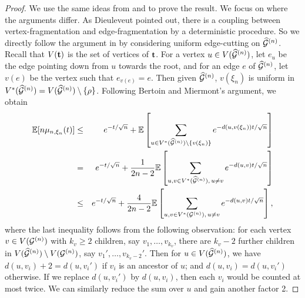 \documentclass[11pt,a4paper]{article}
\newcommand{\bE}{\mathbb{E}}
\newcommand{\cG}{\mathcal{G}}
\begin{document}
\begin{proof}
We use the same ideas from  \cite[Corollary 2]{BM} and   \cite[Lemma 4.5]{Die13} to prove the result. We focus on where the arguments differ. As Dieuleveut pointed out, there is a coupling between vertex-fragmentation and edge-fragmentation by a deterministic procedure. So we directly follow the argument in \cite{BM} by considering uniform edge-cutting on $\widehat{\cal G}^{(n)}$. Recall that $V({\bf t})$ is the set of vertices of ${\bf t}$. For a vertex $u \in V (\widehat{\cal G}^{(n)})$, let $e_u$ be the edge pointing down from $u$ towards the root, and for an edge $e$ of $\widehat{\cal G}^{(n)}$, let $v(e)$ be the vertex such that $e_{v(e)} = e$. Then given $\widehat{\cal G}^{(n)}$, $v(\xi_n)$  is uniform in $V^*(\widehat{\cG}^{(n)})=V(\widehat{\cal G}^{(n)} )\setminus\{\rho\}$. Following Bertoin and Miermont's argument, we obtain
\begin{eqnarray}
{\bE}[n\mu_{n, \xi_n}(t)]&\leq& e^{-t/\sqrt{n}}+{\bE}\left[ \sum_{u\in V^*(\widehat{\cal G}^{(n)})\setminus \{v(\xi_n)\}}e^{-d(u, v(\xi_n))t/\sqrt{n}}\right]\cr
&= &  e^{-t/\sqrt{n}}+\frac{1}{2n-2}{\bE}\left[ \sum_{u, v\in V^*(\widehat{\cal G}^{(n)}),\,u\neq v}e^{-d(u, v)t/\sqrt{n}}\right]\cr
&\leq & e^{-t/\sqrt{n}}+\frac{4}{2n-2}{\bE}\left[ \sum_{u, v\in V^*({\cal G}^{(n)}),\,u\neq v}e^{-d(u, v)t/\sqrt{n}}\right],
\end{eqnarray}
where the last inequality follows from the following observation: for each vertex $v\in V({\cal G}^{(n)})$ with $k_{v}\geq2$ children, say $v_1,\ldots, v_{k_{v}}$, there are $k_{v}-2$ further children in $V(\widehat{\cal G}^{(n)})\setminus V({\cal G}^{(n)})$, say $v_1',\ldots, v_{k_{v}-2}'$. Then for $u\in V(\widehat{\cal G}^{(n)})$, we have $d(u, v_i)+2= d(u, v_i')$ if $v_i$ is an ancestor of $u$; and $d(u, v_i)= d(u, v_i')$ otherwise. If we replace $d(u, v_i')$ by $d(u,v_i)$, then each $ v_i$ would be counted at most twice. We can similarly reduce the sum over $u$ and gain another factor 2.


\end{proof}
\end{document}
